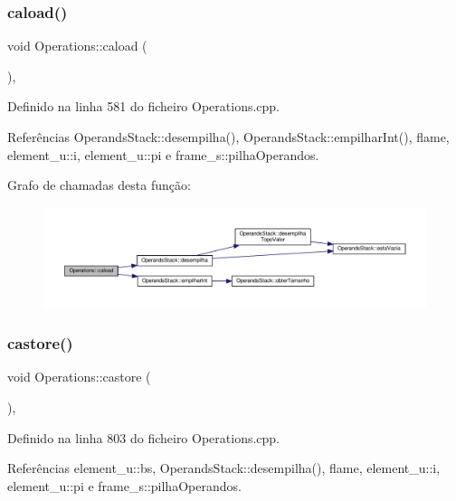 \subsubsection{\texorpdfstring{caload()}{caload()}}
{\footnotesize\ttfamily void Operations\+::caload (\begin{DoxyParamCaption}{ }\end{DoxyParamCaption})\hspace{0.3cm}{\ttfamily [static]}, {\ttfamily [private]}}



Definido na linha 581 do ficheiro Operations.\+cpp.



Referências Operands\+Stack\+::desempilha(), Operands\+Stack\+::empilhar\+Int(), flame, element\+\_\+u\+::i, element\+\_\+u\+::pi e frame\+\_\+s\+::pilha\+Operandos.

Grafo de chamadas desta função\+:
\nopagebreak
\begin{figure}[H]
\begin{center}
\leavevmode
\includegraphics[width=350pt]{classOperations_a4bb55ffc2ba79a76a019a0c02d29d7f9_cgraph}
\end{center}
\end{figure}
\mbox{\label{classOperations_a417c4833f2f048350920358961cfab03}} 
\subsubsection{\texorpdfstring{castore()}{castore()}}
{\footnotesize\ttfamily void Operations\+::castore (\begin{DoxyParamCaption}{ }\end{DoxyParamCaption})\hspace{0.3cm}{\ttfamily [static]}, {\ttfamily [private]}}



Definido na linha 803 do ficheiro Operations.\+cpp.



Referências element\+\_\+u\+::bs, Operands\+Stack\+::desempilha(), flame, element\+\_\+u\+::i, element\+\_\+u\+::pi e frame\+\_\+s\+::pilha\+Operandos.

